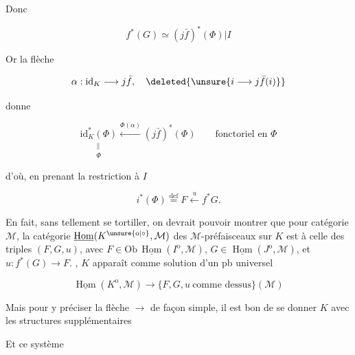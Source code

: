 Donc

\[
f^*(G)\simeq(j\bar f)^*(\Phi)|I
\]

Or la flèche

\[
\alpha:\mathrm{id}_K\longrightarrow j\bar f,\quad
\deleted{\unsure{i\longrightarrow j\bar f(i)}}
\]

donne

\[
\underset{\substack{\parallel\\\Phi}}{\mathrm{id}_K^*(\Phi)}
\xleftarrow{\Phi(\alpha)}(j\bar f)^*(\Phi)
\qquad\text{fonctoriel en }\Phi
\]

d'où, en prenant la restriction à $I$

\[
i^*(\Phi)\overset{\mathrm{def}}{=}F\xleftarrow{u}f^*G.
\]

En fait, sans tellement se tortiller, on devrait pouvoir montrer que  pour  catégorie $\mathcal M$, la catégorie $\underline{\operatorname{Hom}}(K^{\unsure{\mathrm o|\circ}},\mathcal M)$ des $\mathcal M$-préfaisceaux sur $K$ est  à celle des triples $(F,G,u)$, avec $F\in\mathrm{Ob}\,\underline{\operatorname{Hom}}(I^{\mathrm o},\mathcal M)$, $G\in\underline{\operatorname{Hom}}(J^{\mathrm o},\mathcal M)$, et $u:f^*(G)\longrightarrow F$.  , $K$ apparaît comme solution d'un pb  universel


\[
\underline{\operatorname{Hom}}(K^{\mathrm o},\mathcal M)\longrightarrow
\{F,G,u\ \text{comme dessus}\}(\mathcal M)
\]

Mais pour y préciser la flèche $\longrightarrow$ de façon  simple, il est bon de se donner $K$ avec les structures supplémentaires


Et ce système
